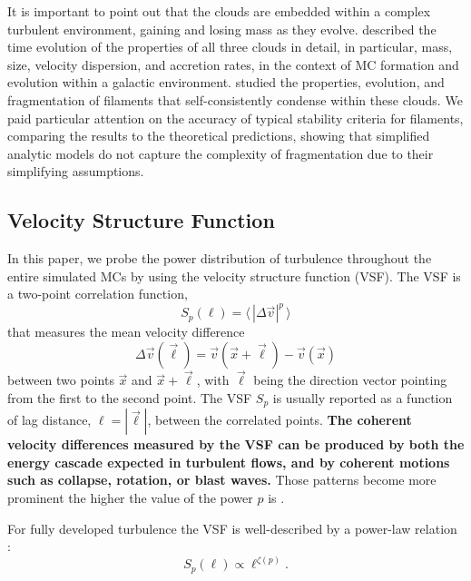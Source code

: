 It is important to point out that the clouds are embedded within a complex turbulent environment, gaining and losing mass as they evolve.
 described the time evolution of the properties of all three clouds in detail, in particular, mass, size, velocity dispersion, and accretion rates, in the context of MC formation and evolution within a galactic environment.
 studied the properties, evolution, and fragmentation of filaments that self-consistently condense within these clouds. 
We paid particular attention on the accuracy of typical stability criteria for filaments, comparing the results to the theoretical predictions, showing that simplified analytic models do not capture the complexity of fragmentation due to their simplifying assumptions.


\subsection{Velocity Structure Function}\label{methods:vsf}

In this paper, we probe the power distribution of turbulence throughout the entire simulated MCs by using the velocity structure function (VSF).
The VSF is a two-point correlation function,
\begin{equation}
	{S}_p (\ell) = \langle \, |\Delta \vec{v}|^p  \, \rangle
	\label{equ:method:def_vsf}
\end{equation}
that measures the mean velocity difference 
\begin{equation}
    \Delta \vec{v} (\vec{\ell}) = \vec{v}(\vec{x}+\vec{\ell}) - \vec{v}(\vec{x})
\end{equation} 
between two points $\vec{x}$ and $\vec{x}+\vec{\ell}$, with $\vec{\ell}$ being the direction vector pointing from the first to the second point.
The VSF $S_p$ is usually reported as a function of lag distance, $\ell = |\vec{\ell}|$, between the correlated points.
\textbf{
The coherent velocity differences measured by the VSF can be produced by both the energy cascade expected in turbulent flows, and by coherent motions such as collapse, rotation, or blast waves.
}
Those patterns become more prominent the higher the value of the power $p$ is \citep{Heyer2004}.

For fully developed turbulence the VSF is well-described by a power-law relation \citep{Kolmogorov1941,She1994,Boldyrev2002}:
\begin{equation}
	\mathit{S}_p (\ell) \propto \ell^{\zeta(p)}.
	\label{equ:method:propto_zeta}
\end{equation}

